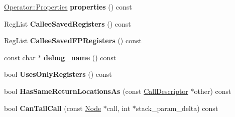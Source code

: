 \begin{DoxyCompactItemize}
\item 
\hyperlink{classv8_1_1base_1_1_flags}{Operator\+::\+Properties} {\bfseries properties} () const \hypertarget{classv8_1_1internal_1_1compiler_1_1_call_descriptor_ab9123f5162c32870e9ee22618880ed1e}{}\label{classv8_1_1internal_1_1compiler_1_1_call_descriptor_ab9123f5162c32870e9ee22618880ed1e}

\item 
Reg\+List {\bfseries Callee\+Saved\+Registers} () const \hypertarget{classv8_1_1internal_1_1compiler_1_1_call_descriptor_a586bb0679e25956e582d348aba4ba6ff}{}\label{classv8_1_1internal_1_1compiler_1_1_call_descriptor_a586bb0679e25956e582d348aba4ba6ff}

\item 
Reg\+List {\bfseries Callee\+Saved\+F\+P\+Registers} () const \hypertarget{classv8_1_1internal_1_1compiler_1_1_call_descriptor_a01395041e63be763888849d20f9e4088}{}\label{classv8_1_1internal_1_1compiler_1_1_call_descriptor_a01395041e63be763888849d20f9e4088}

\item 
const char $\ast$ {\bfseries debug\+\_\+name} () const \hypertarget{classv8_1_1internal_1_1compiler_1_1_call_descriptor_a644f107f3de7cff22b4b16ec200a6e79}{}\label{classv8_1_1internal_1_1compiler_1_1_call_descriptor_a644f107f3de7cff22b4b16ec200a6e79}

\item 
bool {\bfseries Uses\+Only\+Registers} () const \hypertarget{classv8_1_1internal_1_1compiler_1_1_call_descriptor_a36b73f406c7acf4328a96f1fd637902d}{}\label{classv8_1_1internal_1_1compiler_1_1_call_descriptor_a36b73f406c7acf4328a96f1fd637902d}

\item 
bool {\bfseries Has\+Same\+Return\+Locations\+As} (const \hyperlink{classv8_1_1internal_1_1compiler_1_1_call_descriptor}{Call\+Descriptor} $\ast$other) const \hypertarget{classv8_1_1internal_1_1compiler_1_1_call_descriptor_a7def942a64383aa2415225c6543024e9}{}\label{classv8_1_1internal_1_1compiler_1_1_call_descriptor_a7def942a64383aa2415225c6543024e9}

\item 
bool {\bfseries Can\+Tail\+Call} (const \hyperlink{classv8_1_1internal_1_1compiler_1_1_node}{Node} $\ast$call, int $\ast$stack\+\_\+param\+\_\+delta) const \hypertarget{classv8_1_1internal_1_1compiler_1_1_call_descriptor_a923d5f23b1a8320bcc5ba4cefed7cc5d}{}\label{classv8_1_1internal_1_1compiler_1_1_call_descriptor_a923d5f23b1a8320bcc5ba4cefed7cc5d}

\end{DoxyCompactItemize}
